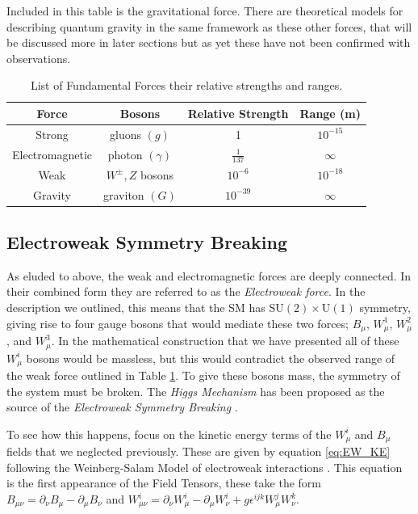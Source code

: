 Included in this table is the gravitational force. There are theoretical models for describing quantum gravity in the same framework as these other forces, that will be discussed more in later sections but as yet these have not been confirmed with observations.

\begin{table}
\begin{center}
\begin{tabular}{c|c|c|c}
\hline 
\hline
Force & Bosons & Relative Strength & Range (m) \\ \hline \hline
Strong & gluons $\left(g\right)$ & 1 & $10^{-15}$ \\
Electromagnetic & photon $\left(\gamma\right)$ & $\frac{1}{137}$ & $\infty$ \\
Weak & $W^{\pm}, Z$ bosons & $10^{-6}$ & $10^{-18}$ \\
Gravity & graviton $\left(G\right)$ & $10^{-39}$ & $\infty$ \\
\hline
\end{tabular}
\end{center}
\caption[List of Fundamental Forces their relative strengths and ranges.]{List of Fundamental Forces their relative strengths and ranges.}
\label{tab:Forces}
\end{table}

\subsection{Electroweak Symmetry Breaking}
\label{sec:EWsymmetry}
As eluded to above, the weak and electromagnetic forces are deeply connected. In their combined form they are referred to as the \textit{Electroweak force}. In the description we outlined, this means that the SM has $\mathrm{SU}(2) \times \mathrm{U}(1)$ symmetry, giving rise to four gauge bosons that would mediate these two forces; $B_{\mu}$, $W_{\mu}^{1}$, $W_{\mu}^{2}$, and $W_{\mu}^{3}$. In the mathematical construction that we have presented all of these $W_{\mu}^{i}$ bosons would be massless, but this would contradict the observed range of the weak force outlined in Table \ref{tab:Forces}. To give these bosons mass, the symmetry of the system must be broken. The \textit{Higgs Mechanism} \cite{Higgs:1964ia,Higgs:1964pj,Higgs:1966ev,Englert:1964et,Guralnik:1964eu,Kibble:1967sv} has been proposed as the source of the \textit{Electroweak Symmetry Breaking} \cite{Dawson:2008jk}. 

To see how this happens, focus on the kinetic energy terms of the $W_{\mu}^{i}$ and $B_{\mu}$ fields that we neglected previously. These are given by equation \eqref{eq:EW_KE} following the Weinberg-Salam Model of electroweak interactions \cite{StandardModel67_1,StandardModel67_2,StandardModel67_3,StandardModel67_4}. This equation is the first appearance of the Field Tensors, these take the form $B_{\mu \nu} = \partial_{\nu}B_{\mu} - \partial_{\mu}B_{\nu}$ and $W_{\mu \nu}^{i} = \partial_{\nu}W_{\mu}^{i} - \partial_{\mu}W_{\nu}^{i} + g\epsilon^{ijk}W_{\mu}^{j}W_{\nu}^{k}$.

